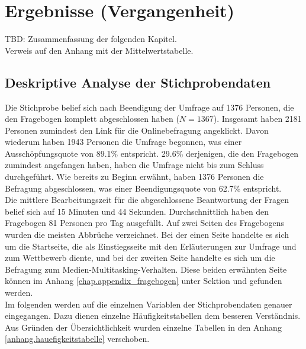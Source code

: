 %
%
\glsresetall
\chapter{Ergebnisse (Vergangenheit)}
TBD: Zusammenfassung der folgenden Kapitel.\\
Verweis auf den Anhang mit der Mittelwertstabelle.
\section{Deskriptive Analyse der Stichprobendaten}
\label{label.stichprobe}
Die Stichprobe belief sich nach Beendigung der Umfrage auf 1376 Personen, die den Fragebogen komplett abgeschlossen haben ($N = 1367$). Insgesamt haben 2181 Personen zumindest den Link für die Onlinebefragung angeklickt. Davon wiederum haben 1943 Personen die Umfrage begonnen, was einer Ausschöpfungsquote von 89.1\% entspricht. 29.6\% derjenigen, die den Fragebogen zumindest angefangen haben, haben die Umfrage nicht bis zum Schluss durchgeführt. Wie bereits zu Beginn erwähnt, haben 1376 Personen die Befragung abgeschlossen, was einer Beendigungsquote von 62.7\% entspricht.\\
Die mittlere Bearbeitungszeit für die abgeschlossene Beantwortung der Fragen belief sich auf 15 Minuten und 44 Sekunden. Durchschnittlich haben den Fragebogen 81 Personen pro Tag ausgefüllt. Auf zwei Seiten des Fragebogens wurden die meisten Abbrüche verzeichnet. Bei der einen Seite handelte es sich um die Startseite, die als Einstiegsseite mit den Erläuterungen zur Umfrage und zum Wettbewerb diente, und bei der zweiten Seite handelte es sich um die Befragung zum Medien-Multitasking-Verhalten. Diese beiden erwähnten Seite können im Anhang \ref{chap.appendix_fragebogen} unter Sektion  und  gefunden werden.\\
Im folgenden werden auf die einzelnen Variablen der Stichprobendaten genauer eingegangen. Dazu dienen einzelne Häufigkeitstabellen dem besseren Verständnis. Aus Gründen der Übersichtlichkeit wurden einzelne Tabellen in den Anhang \ref{anhang.hauefigkeitstabelle} verschoben.
